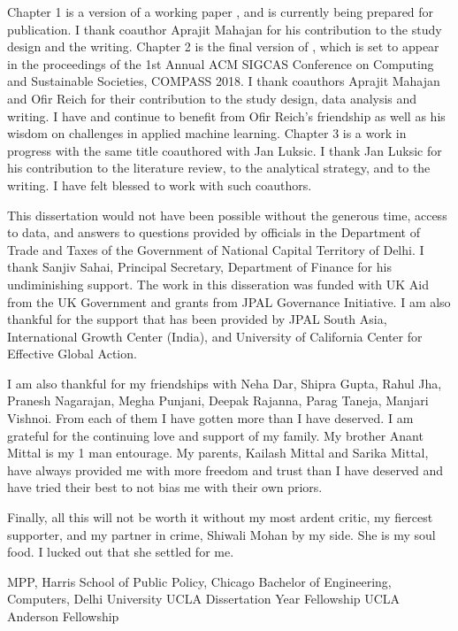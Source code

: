 {Chapter 1 is a version of a working paper \cite{mittal2017vat}, and is currently being prepared for publication. I thank coauthor Aprajit Mahajan for his contribution to the study design and the writing. Chapter 2 is the final version of \cite{mittal2018bogus}, which is set to appear in the proceedings of the 1st Annual ACM SIGCAS Conference on Computing and Sustainable Societies, COMPASS 2018. I thank coauthors Aprajit Mahajan and Ofir Reich for their contribution to the study design, data analysis and writing. I have and continue to benefit from Ofir Reich's friendship as well as his wisdom on challenges in applied machine learning. Chapter 3 is a work in progress with the same title coauthored with Jan Luksic. I thank Jan Luksic for his contribution to the literature review, to the analytical strategy, and to the writing. I have felt blessed to work with such coauthors.

This dissertation would not have been possible without the generous time, access to data, and answers to questions provided by officials in the Department of Trade and Taxes of the Government of National Capital Territory of Delhi. I thank Sanjiv Sahai, Principal Secretary, Department of Finance for his undiminishing support. The work in this disseration was funded with UK Aid from the UK Government and grants from JPAL Governance Initiative. I am also thankful for the support that has been provided by JPAL South Asia, International Growth Center (India), and University of California Center for Effective Global Action.

I am also thankful for my friendships with Neha Dar, Shipra Gupta, Rahul Jha, Pranesh Nagarajan, Megha Punjani, Deepak Rajanna, Parag Taneja, Manjari Vishnoi. From each of them I have gotten more than I have deserved. I am grateful for the continuing love and support of my family. My brother Anant Mittal is my 1 man entourage. My parents, Kailash Mittal and Sarika Mittal, have always provided me with more freedom and trust than I have deserved and have tried their best to not bias me with their own priors. 

Finally, all this will not be worth it without my most ardent critic, my fiercest supporter, and my partner in crime, Shiwali Mohan by my side. She is my soul food. I lucked out that she settled for me.}
 {}
 {MPP, Harris School of Public Policy, Chicago}
 {Bachelor of Engineering, Computers, Delhi University}
 {}
 {UCLA Dissertation Year Fellowship}
 {UCLA Anderson Fellowship\vspace{0.8cm}}

